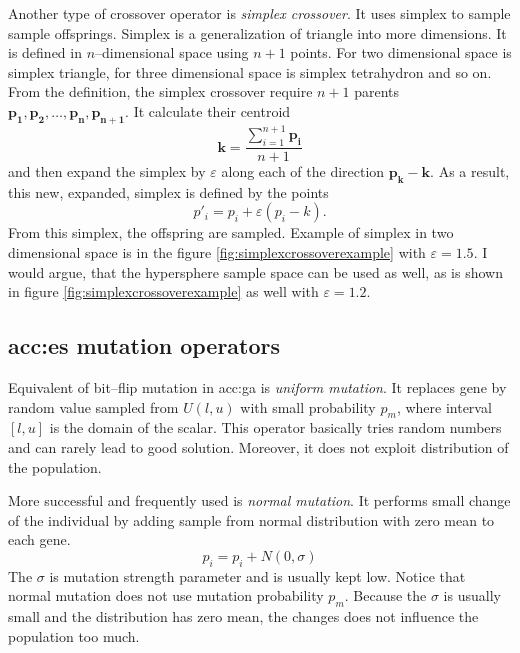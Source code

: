 Another type of crossover operator is \emph{simplex crossover}. It uses simplex to sample sample offsprings. Simplex is a generalization of triangle into more dimensions. It is defined in $n$--dimensional space using $n+1$ points. For two dimensional space is simplex triangle, for three dimensional space is simplex tetrahydron and so on. From the definition, the simplex crossover require $n+1$ parents $\mathbf{p_1}, \mathbf{p_2}, \dots, \mathbf{p_n}, \mathbf{p_{n+1}}$. It calculate their centroid
$$
\mathbf{k}=\frac{\sum_{i=1}^{n+1} \mathbf{p_i}}{n+1}
$$
and then expand the simplex by $\varepsilon$ along each of the direction $\mathbf{p_k} - \mathbf{k}$. As a result, this new, expanded, simplex is defined by the points
\boldmath
$$
p'_i = p_i + \varepsilon\left( p_i - k \right).
$$
\unboldmath
From this simplex, the offspring are sampled. Example of simplex in two dimensional space is in the figure \ref{fig:simplexcrossoverexample} with $\varepsilon=1.5$.
I would argue, that the hypersphere sample space can be used as well, as is shown in figure \ref{fig:simplexcrossoverexample} as well with $\varepsilon=1.2$.

\subsection{\texorpdfstring{\acrshort*{acc:es} mutation operators}{Mutation operators}}

Equivalent of bit--flip mutation in \acrshort{acc:ga} is \emph{uniform mutation}. It replaces gene by random value sampled from $U(l,u)$ with small probability $p_m$, where interval $\left[l,u\right]$ is the domain of the scalar. This operator basically tries random numbers and can rarely lead to good solution. Moreover, it does not exploit distribution of the population.

More successful and frequently used is \emph{normal mutation}. It performs small change of the individual by adding sample from normal distribution with zero mean to each gene.
$$
p_i = p_i + N(0,\sigma)
$$
The $\sigma$ is mutation strength parameter and is usually kept low. Notice that normal mutation does not use mutation probability $p_m$. Because the $\sigma$ is usually small and the distribution has zero mean, the changes does not influence the population too much.

